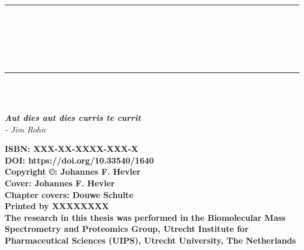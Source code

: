 \cleardoublepage
\pagestyle{empty} %
\frontmatter %

\begin{titlepage}
    \begin{center}
        \rule{\textwidth}{1.5pt}\\[0cm]
        {\huge \bfseries \thesistitle \par \ }\\[-0.5cm]
        \rule{\textwidth}{1.5pt}\\[2.5cm]
        {\large \bfseries\name}\\
        [2cm]
        \begin{small}
            \emph{\textbf{Aut dies aut dies curris te currit} \\
                - Jim Rohn}
        \end{small}
    \end{center}
    \clearpage
    \begin{flushleft}
        \vspace*{\fill}

        {\small \textbf{ISBN: XXX-XX-XXXX-XXX-X}\\
        \textbf{DOI: https://doi.org/10.33540/1640}\\
        [0.5cm]
        \textbf{Copyright ©: Johannes F. Hevler}\\
        \textbf{Cover: Johannes F. Hevler}\\
        \textbf{Chapter covers: Douwe Schulte}\\
        \textbf{Printed by XXXXXXXX}\\
        [0.5cm]
        \textbf{The research in this thesis was performed in the Biomolecular Mass
            Spectrometry and Proteomics Group, Utrecht Institute for Pharmaceutical Sciences (UIPS), Utrecht University, The Netherlands}}

    \end{flushleft}
    \clearpage


\end{titlepage}
